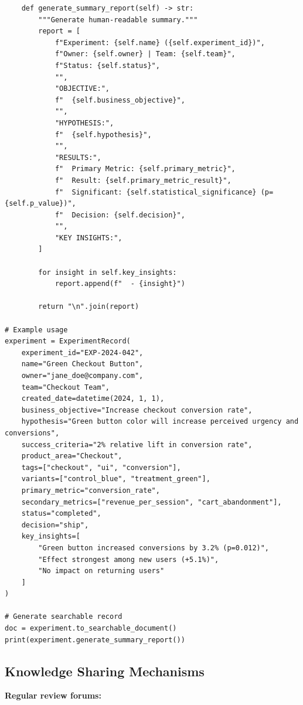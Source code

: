 \begin{lstlisting}
    def generate_summary_report(self) -> str:
        """Generate human-readable summary."""
        report = [
            f"Experiment: {self.name} ({self.experiment_id})",
            f"Owner: {self.owner} | Team: {self.team}",
            f"Status: {self.status}",
            "",
            "OBJECTIVE:",
            f"  {self.business_objective}",
            "",
            "HYPOTHESIS:",
            f"  {self.hypothesis}",
            "",
            "RESULTS:",
            f"  Primary Metric: {self.primary_metric}",
            f"  Result: {self.primary_metric_result}",
            f"  Significant: {self.statistical_significance} (p={self.p_value})",
            f"  Decision: {self.decision}",
            "",
            "KEY INSIGHTS:",
        ]

        for insight in self.key_insights:
            report.append(f"  - {insight}")

        return "\n".join(report)

# Example usage
experiment = ExperimentRecord(
    experiment_id="EXP-2024-042",
    name="Green Checkout Button",
    owner="jane_doe@company.com",
    team="Checkout Team",
    created_date=datetime(2024, 1, 1),
    business_objective="Increase checkout conversion rate",
    hypothesis="Green button color will increase perceived urgency and conversions",
    success_criteria="2% relative lift in conversion rate",
    product_area="Checkout",
    tags=["checkout", "ui", "conversion"],
    variants=["control_blue", "treatment_green"],
    primary_metric="conversion_rate",
    secondary_metrics=["revenue_per_session", "cart_abandonment"],
    status="completed",
    decision="ship",
    key_insights=[
        "Green button increased conversions by 3.2% (p=0.012)",
        "Effect strongest among new users (+5.1%)",
        "No impact on returning users"
    ]
)

# Generate searchable record
doc = experiment.to_searchable_document()
print(experiment.generate_summary_report())
\end{lstlisting}

\subsection{Knowledge Sharing Mechanisms}

\textbf{Regular review forums:}

